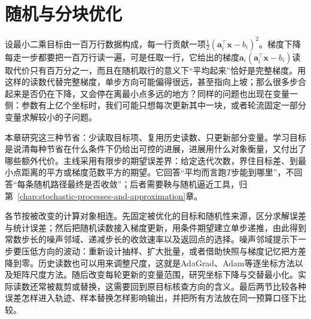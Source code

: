 \chapter{随机与分块优化}
\label{chap:opt-stochastic-block}

设最小二乘目标由一百万行数据构成，每一行贡献一项$\tfrac12(\bm a_i^\top\bm x-b_i)^2$。梯度下降每走一步都要把一百万行读一遍，可是任取一行，它给出的梯度$\bm a_i(\bm a_i^\top\bm x-b_i)$读取代价只有百万分之一，而且在随机取行的意义下“平均起来”恰好是完整梯度。用这样的读数代替完整梯度，单步方向可能偏得很远，甚至指向上坡；那么很多步合起来是否仍在下降，又会停在离最小点多远的地方？同样的问题也出现在变量一侧：参数有上亿个坐标时，我们可能只想每次更新其中一块，或者轮流固定一部分变量求解较小的子问题。

本章研究这三种节省：少读取目标项、复用历史读数、只更新部分变量。学习目标是说清每种节省在什么条件下仍给出可控的进展，进展用什么对象衡量，又付出了哪些额外代价。主线采用有限步的期望误差界：给定迭代次数，界住目标差、到最小点距离的平方或梯度范数平方的期望。它回答“平均而言跑$T$步能到哪里”，不回答“每条随机路径最终是否收敛”；后者需要鞅与随机逼近工具，归第~\ref{chap:stochastic-processes-and-approximation}章。

各节按被改变的计算对象相连。先固定被优化的目标和随机性来源，区分求解误差与统计误差；然后把随机读数接入梯度更新，用条件期望建立单步递推，由此得到常数步长的噪声邻域、递减步长的收敛速率以及返回点的选择。噪声邻域提示下一步要压低方向的波动：重新设计抽样、扩大批量，或者借助快照与梯度记忆把方差降到零。历史读数也可以用来调整尺度，这就是AdaGrad、Adam等逐坐标方法以及矩阵尺度方法。随后改变每轮更新的变量范围，研究坐标下降与交替最小化。实际读数还常被裁剪或替换，这需要回到原目标核查方向的含义。最后两节比较各种误差怎样进入轨迹、样本替换怎样影响输出，并把所有方法放在同一预算口径下比较。










